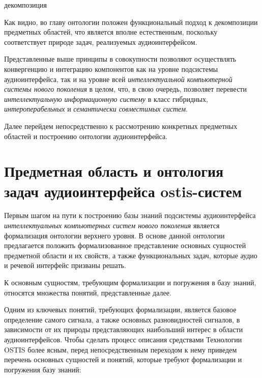 \begin{SCn}
	\begin{scnrelfromset}{декомпозиция}
	\end{scnrelfromset}
\end{SCn}

Как видно, во главу онтологии положен функциональный подход к декомпозиции предметных областей, что является вполне естественным, поскольку соответствует природе задач, реализуемых аудиоинтерфейсом.

Представленные выше принципы в совокупности позволяют осуществлять конвергенцию и интеграцию компонентов как на уровне подсистемы аудиоинтерфейса, так и на уровне всей \textit{интеллектуальной компьютерной системы нового поколения} в целом, что, в свою очередь, позволяет перевести \textit{интеллектуальную информационную систему} в класс гибридных, \textit{интероперабельных} и \textit{семантически совместимых систем}.
  
 Далее перейдем непосредственно к рассмотрению конкретных предметных областей и построению онтологии аудиоинтерфейса.

\section{Предметная область и онтология задач аудиоинтерфейса ostis-систем}
\label{sec_audio_interfaces_subject_area_problems}

Первым шагом на пути к построению базы знаний подсистемы аудиоинтерфейса \textit{интеллектуальных компьютерных систем нового поколения} является формализация онтологии верхнего уровня. В основе данной онтологии предлагается положить формализованное представление основных сущностей предметной области и их свойств, а также функциональных задач, которые аудио и речевой интерфейс призваны решать. 

К основным сущностям, требующим формализации и погружения в базу знаний, относятся множества понятий, представленные далее. 

Одним из ключевых понятий, требующих формализации, является базовое определение самого сигнала, а также основных разновидностей сигналов, в зависимости от их природы представляющих наибольший интерес в области аудиоинтерфейсов. Чтобы сделать процесс описания средствами Технологии OSTIS более ясным, перед непосредственным переходом к нему приведем перечень основных сущностей и понятий, которые требуют формализации и погружения базу знаний:

